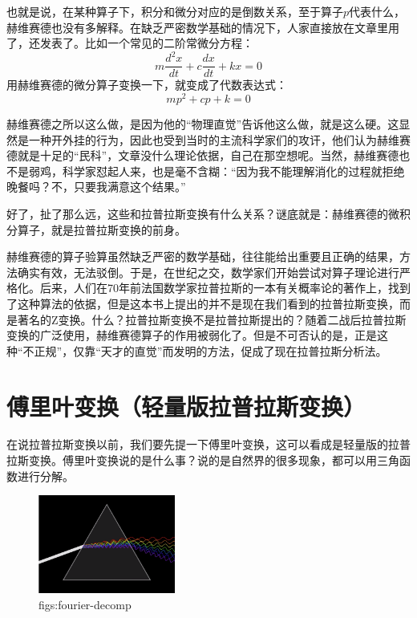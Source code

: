 \documentclass[lang=cn,11pt,a4paper,cite=numbers]{elegantpaper}
\begin{document}
  也就是说，在某种算子下，积分和微分对应的是倒数关系，至于算子$p$代表什么，赫维赛德也没有多解释。在缺乏严密数学基础的情况下，人家直接放在文章里用了，还发表了。比如一个常见的二阶常微分方程：
\begin{equation}
  m\frac{d^{2}x}{dt}+c\frac{dx}{dt}+kx=0
\end{equation}
用赫维赛德的微分算子变换一下，就变成了代数表达式：
\begin{equation}
  mp^{2}+cp+k=0
\end{equation}

  赫维赛德之所以这么做，是因为他的“物理直觉”告诉他这么做，就是这么硬。这显然是一种开外挂的行为，因此也受到当时的主流科学家们的攻讦，他们认为赫维赛德就是十足的“民科”，文章没什么理论依据，自己在那空想呢。当然，赫维赛德也不是弱鸡，科学家怼起人来，也是毫不含糊：“因为我不能理解消化的过程就拒绝晚餐吗？不，只要我满意这个结果。”

  好了，扯了那么远，这些和拉普拉斯变换有什么关系？谜底就是：赫维赛德的微积分算子，就是拉普拉斯变换的前身。

  赫维赛德的算子验算虽然缺乏严密的数学基础，往往能给出重要且正确的结果，方法确实有效，无法驳倒。于是，在世纪之交，数学家们开始尝试对算子理论进行严格化。后来，人们在70年前法国数学家拉普拉斯的一本有关概率论的著作上，找到了这种算法的依据，但是这本书上提出的并不是现在我们看到的拉普拉斯变换，而是著名的Z变换。什么？拉普拉斯变换不是拉普拉斯提出的？随着二战后拉普拉斯变换的广泛使用，赫维赛德算子的作用被弱化了。但是不可否认的是，正是这种“不正规”，仅靠“天才的直觉”而发明的方法，促成了现在拉普拉斯分析法。

\section{傅里叶变换（轻量版拉普拉斯变换）}
  在说拉普拉斯变换以前，我们要先提一下傅里叶变换，这可以看成是轻量版的拉普拉斯变换。傅里叶变换说的是什么事？说的是自然界的很多现象，都可以用三角函数进行分解。
\begin{figure}[!htb]
  \centering
  \includegraphics[width=0.4\textwidth]{figs/fourier-decomp.png}
  \caption{figs:fourier-decomp}
  \label{figs:fourier-decomp}
\end{figure}
\end{document}

